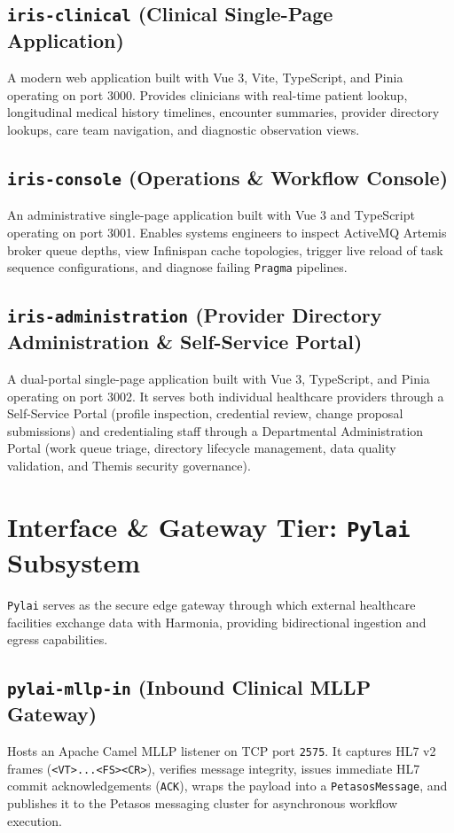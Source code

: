\subsection{\texttt{iris-clinical} (Clinical Single-Page Application)}
A modern web application built with Vue 3, Vite, TypeScript, and Pinia operating on port 3000. Provides clinicians with real-time patient lookup, longitudinal medical history timelines, encounter summaries, provider directory lookups, care team navigation, and diagnostic observation views.

\subsection{\texttt{iris-console} (Operations \& Workflow Console)}
An administrative single-page application built with Vue 3 and TypeScript operating on port 3001. Enables systems engineers to inspect ActiveMQ Artemis broker queue depths, view Infinispan cache topologies, trigger live reload of task sequence configurations, and diagnose failing \texttt{Pragma} pipelines.

\subsection{\texttt{iris-administration} (Provider Directory Administration \& Self-Service Portal)}
A dual-portal single-page application built with Vue 3, TypeScript, and Pinia operating on port 3002. It serves both individual healthcare providers through a Self-Service Portal (profile inspection, credential review, change proposal submissions) and credentialing staff through a Departmental Administration Portal (work queue triage, directory lifecycle management, data quality validation, and Themis security governance).

\section{Interface \& Gateway Tier: \texttt{Pylai} Subsystem}

\texttt{Pylai} serves as the secure edge gateway through which external healthcare facilities exchange data with Harmonia, providing bidirectional ingestion and egress capabilities.

\subsection{\texttt{pylai-mllp-in} (Inbound Clinical MLLP Gateway)}
Hosts an Apache Camel MLLP listener on TCP port \texttt{2575}. It captures HL7 v2 frames (\texttt{<VT>...<FS><CR>}), verifies message integrity, issues immediate HL7 commit acknowledgements (\texttt{ACK}), wraps the payload into a \texttt{PetasosMessage}, and publishes it to the Petasos messaging cluster for asynchronous workflow execution.

